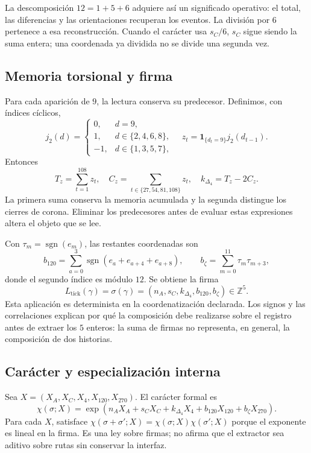 La descomposición \(12=1+5+6\) adquiere así un significado operativo:
el total, las diferencias y las orientaciones recuperan los eventos.
La división por \(6\) pertenece a esa reconstrucción. Cuando el carácter
usa \(s_C/6\), \(s_C\) sigue siendo la suma entera; una coordenada ya
dividida no se divide una segunda vez.

\subsection{Memoria torsional y firma}

Para cada aparición de \(9\), la lectura conserva su predecesor.
Definimos, con índices cíclicos,
\[
 j_2(d)=\begin{cases}0,&d=9,\\1,&d\in\{2,4,6,8\},\\-1,&d\in\{1,3,5,7\},\end{cases}
 \quad z_t=\mathbf1_{\{d_t=9\}}j_2(d_{t-1}).
\]
Entonces
\[
 T_z=\sum_{t=1}^{108}z_t,\quad
 C_z=\sum_{t\in\{27,54,81,108\}}z_t,\quad
 k_{\Delta_4}=T_z-2C_z.
\]
La primera suma conserva la memoria acumulada y la segunda distingue los
cierres de corona. Eliminar los predecesores antes de evaluar estas
expresiones altera el objeto que se lee.

Con \(\tau_m=\operatorname{sgn}(e_m)\), las restantes coordenadas son
\[
 b_{120}=\sum_{a=0}^{3}\operatorname{sgn}(e_a+e_{a+4}+e_{a+8}),
 \qquad b_{\zeta}=\sum_{m=0}^{11}\tau_m\tau_{m+3},
\]
donde el segundo índice es módulo \(12\). Se obtiene la firma
\[
 L_{\mathrm{tick}}(\gamma)
 =\sigma(\gamma)=(n_A,s_C,k_{\Delta_4},b_{120},b_{\zeta})\in\mathbb Z^5.
\]
Esta aplicación es determinista en la coordenatización declarada. Los signos y las
correlaciones explican por qué la composición debe realizarse sobre el
registro antes de extraer los \(5\) enteros: la suma de firmas no
representa, en general, la composición de dos historias.



\subsection{Carácter y especialización interna}

Sea \(X=(X_A,X_C,X_4,X_{120},X_{270})\). El carácter formal es
\[
 \chi(\sigma;X)=\exp\!\left(n_AX_A+s_CX_C+k_{\Delta_4}X_4+
 b_{120}X_{120}+b_{\zeta}X_{270}\right).
\]
Para cada \(X\), satisface
\(\chi(\sigma+\sigma';X)=\chi(\sigma;X)\chi(\sigma';X)\)
porque el exponente es lineal en la firma. Es una ley sobre firmas; no
afirma que el extractor sea aditivo sobre rutas sin conservar la interfaz.


